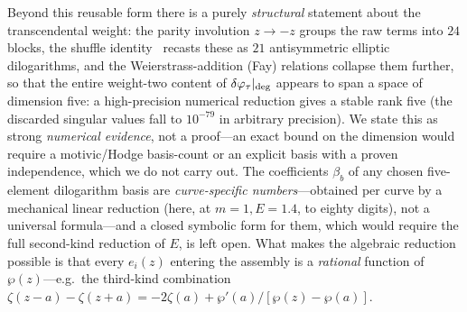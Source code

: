 \documentclass[12pt]{iopart}
\begin{document}
Beyond this reusable form there is a purely \emph{structural} statement about the
transcendental weight: the parity involution $z\to-z$ groups the raw terms into
$24$ blocks, the shuffle identity~\cite{Chen1977} recasts these as $21$
antisymmetric elliptic dilogarithms, and the Weierstrass-addition (Fay) relations
collapse them further, so that the entire weight-two content of
$\delta\varphi_\tau|_{\rm deg}$ appears to span a space of dimension five: a
high-precision numerical reduction gives a stable rank five (the discarded singular
values fall to $10^{-79}$ in arbitrary precision). We state this as strong
\emph{numerical evidence}, not a proof---an exact bound on the dimension would
require a motivic/Hodge basis-count or an explicit basis with a proven
independence, which we do not carry out. The coefficients $\beta_b$ of any chosen
five-element dilogarithm basis are \emph{curve-specific numbers}---obtained per curve by a
mechanical linear reduction (here, at $m=1,E=1.4$, to eighty digits), not a
universal formula---and a closed symbolic form for them, which would require the
full second-kind reduction of $E$, is left open. What makes the algebraic reduction
possible is that every $e_i(z)$ entering the assembly is a \emph{rational} function
of $\wp(z)$---e.g.\ the third-kind combination
$\zeta(z-a)-\zeta(z+a)=-2\zeta(a)+\wp'(a)/[\wp(z)-\wp(a)]$.
\end{document}
